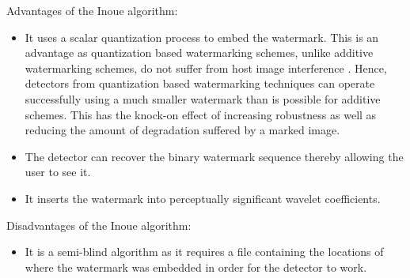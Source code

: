 \documentclass[12pt]{report}
\begin{document}
Advantages of the Inoue algorithm:
\begin{itemize}
	\item It uses a scalar quantization process to embed the 
	watermark. This is an advantage as quantization
	based watermarking schemes, unlike additive watermarking schemes, do not suffer from host image
	interference \cite{meerMasters}.	
	Hence, detectors from quantization
        based watermarking techniques can operate successfully using a much smaller
	watermark than is possible for additive schemes. This has the knock-on effect
	of increasing robustness as well as reducing the amount of degradation suffered 
	by a marked image.
	\item The detector can recover the binary watermark
	sequence thereby allowing the user to see it.
	\item It inserts the watermark into perceptually significant wavelet coefficients.
\end{itemize}
Disadvantages of the Inoue algorithm:
\begin{itemize}
        \item It is a semi-blind algorithm as it
	requires a file containing the locations of where the watermark
	was embedded in order for the detector to work. 
\end{itemize}
\end{document}
